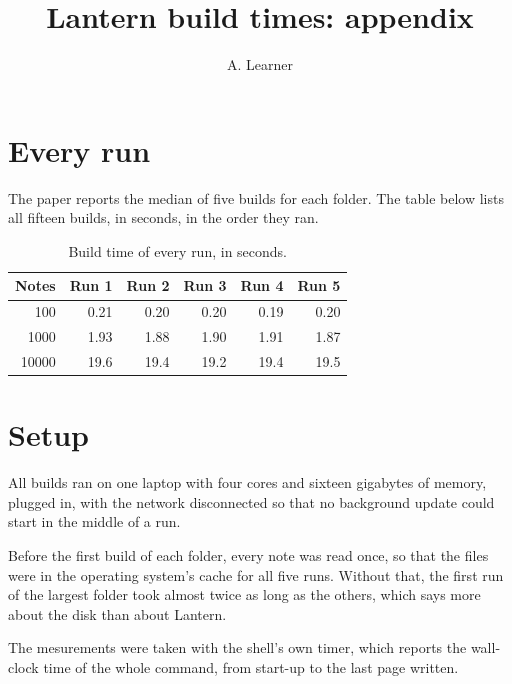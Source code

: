 \documentclass[12pt]{article}
\title{Lantern build times: appendix}
\author{A. Learner}
\date{}
\begin{document}
\maketitle
\appendix

\section{Every run}
\label{sec:runs}

The paper reports the median of five builds for each folder. The table
below lists all fifteen builds, in seconds, in the order they ran.

\begin{table}[h]
  \centering
  \begin{tabular}{rrrrrr}
    \hline
    Notes & Run 1 & Run 2 & Run 3 & Run 4 & Run 5 \\
    \hline
    100 & 0.21 & 0.20 & 0.20 & 0.19 & 0.20 \\
    1000 & 1.93 & 1.88 & 1.90 & 1.91 & 1.87 \\
    10000 & 19.6 & 19.4 & 19.2 & 19.4 & 19.5 \\
    \hline
  \end{tabular}
  \caption{Build time of every run, in seconds.}
  \label{tab:runs}
\end{table}

\section{Setup}
\label{sec:setup}

All builds ran on one laptop with four cores and sixteen gigabytes of
memory, plugged in, with the network disconnected so that no
background update could start in the middle of a run.

Before the first build of each folder, every note was read once, so
that the files were in the operating system's cache for all five runs.
Without that, the first run of the largest folder took almost twice as
long as the others, which says more about the disk than about Lantern.

The mesurements were taken with the shell's own timer, which reports
the wall-clock time of the whole command, from start-up to the last
page written.

\printbibliography
\end{document}
